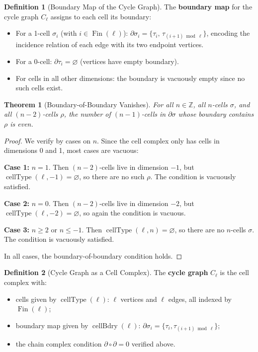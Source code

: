 \documentclass[11pt]{article}
\theoremstyle{plain}
\newtheorem*{theorem}{Theorem}
\theoremstyle{definition}
\newtheorem*{definition}{Definition}
\theoremstyle{remark}
\begin{document}
\begin{definition}[Boundary Map of the Cycle Graph]
The \textbf{boundary map} for the cycle graph $C_\ell$ assigns to each cell its boundary:
\begin{itemize}
\item For a 1-cell $\sigma_i$ (with $i \in \operatorname{Fin}(\ell)$): $\partial\sigma_i = \{\tau_i,\, \tau_{(i+1)\bmod\ell}\}$, encoding the incidence relation of each edge with its two endpoint vertices.
\item For a 0-cell: $\partial\tau_i = \varnothing$ (vertices have empty boundary).
\item For cells in all other dimensions: the boundary is vacuously empty since no such cells exist.
\end{itemize}
\end{definition}

\begin{theorem}[Boundary-of-Boundary Vanishes]
For all $n \in \mathbb{Z}$, all $n$-cells $\sigma$, and all $(n-2)$-cells $\rho$, the number of $(n-1)$-cells in $\partial\sigma$ whose boundary contains $\rho$ is even.
\end{theorem}

\begin{proof}
We verify by cases on $n$. Since the cell complex only has cells in dimensions 0 and 1, most cases are vacuous:

\textbf{Case 1:} $n = 1$. Then $(n-2)$-cells live in dimension $-1$, but $\operatorname{cellType}(\ell, -1) = \varnothing$, so there are no such $\rho$. The condition is vacuously satisfied.

\textbf{Case 2:} $n = 0$. Then $(n-2)$-cells live in dimension $-2$, but $\operatorname{cellType}(\ell, -2) = \varnothing$, so again the condition is vacuous.

\textbf{Case 3:} $n \geq 2$ or $n \leq -1$. Then $\operatorname{cellType}(\ell, n) = \varnothing$, so there are no $n$-cells $\sigma$. The condition is vacuously satisfied.

In all cases, the boundary-of-boundary condition holds.
\end{proof}

\begin{definition}[Cycle Graph as a Cell Complex]
The \textbf{cycle graph} $C_\ell$ is the cell complex with:
\begin{itemize}
\item cells given by $\operatorname{cellType}(\ell)$: $\ell$ vertices and $\ell$ edges, all indexed by $\operatorname{Fin}(\ell)$;
\item boundary map given by $\operatorname{cellBdry}(\ell)$: $\partial\sigma_i = \{\tau_i, \tau_{(i+1)\bmod\ell}\}$;
\item the chain complex condition $\partial\circ\partial = 0$ verified above.
\end{itemize}
\end{definition}
\end{document}
